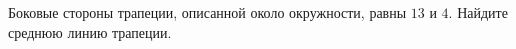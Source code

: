 \begin{ex}
	\begin{condition}
		Боковые стороны трапеции, описанной около окружности, равны \( 13 \) и \( 4 \). Найдите среднюю линию трапеции.
	\end{condition}
\end{ex}